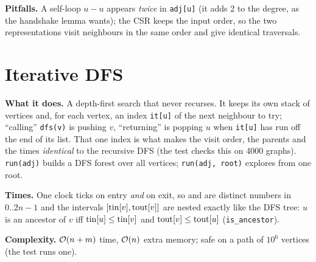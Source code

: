 \textbf{Pitfalls.} A self-loop $u{-}u$ appears \emph{twice} in \texttt{adj[u]} (it adds 2 to the degree, as the handshake lemma wants); the CSR keeps the input order, so the two representations visit neighbours in the same order and give identical traversals.



\clneed
\section{Iterative DFS}
\label{sec:cl-iterdfs}

\textbf{What it does.} A depth-first search that never recurses. It keeps its own stack of vertices and, for each vertex, an index \texttt{it[u]} of the next neighbour to try; ``calling'' \texttt{dfs(v)} is pushing $v$, ``returning'' is popping $u$ when \texttt{it[u]} has run off the end of its list. That one index is what makes the visit order, the parents and the times \emph{identical} to the recursive DFS (the test checks this on 4000 graphs). \texttt{run(adj)} builds a DFS forest over all vertices; \texttt{run(adj, root)} explores from one root.

\textbf{Times.} One clock ticks on entry \emph{and} on exit, so  and  are distinct numbers in $0..2n-1$ and the intervals $[\mathrm{tin}[v],\mathrm{tout}[v]]$ are nested exactly like the DFS tree: $u$ is an ancestor of $v$ iff $\mathrm{tin}[u]\le\mathrm{tin}[v]$ and $\mathrm{tout}[v]\le\mathrm{tout}[u]$ (\texttt{is\_ancestor}).

\textbf{Complexity.} $\mathcal{O}(n+m)$ time, $\mathcal{O}(n)$ extra memory; safe on a path of $10^6$ vertices (the test runs one).

